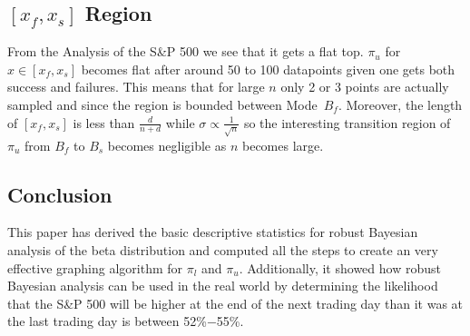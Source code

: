 \documentclass[12pt,letterpaper]{article}
\begin{document}
\subsection{$[x_f,x_s]$ Region}
From the Analysis of the S\&P 500 we see that it gets a flat top. 
$\pi_u$ for $x\in[x_f,x_s]$ becomes flat after around 50 to 100 datapoints given one gets both success and failures.
This means that for large $n$ only 2 or 3 points are actually sampled and since the region is bounded between \mbox{Mode $B_f$}.
Moreover, the length of $[x_f,x_s]$ is less than $\frac{d}{n+d}$ while $\sigma\propto\frac{1}{\sqrt{n}}$ so the interesting 
transition region of $\pi_u$ from $B_f$ to $B_s$ becomes negligible as $n$ becomes large. 
\subsection{Conclusion}
This paper has derived the basic descriptive statistics for robust Bayesian analysis of the beta distribution and computed all the steps to create 
an very effective graphing algorithm for $\pi_l$ and $\pi_u$. Additionally, it showed how robust Bayesian analysis can
be used in the real world by determining the likelihood that  the S\&P 500 will be higher at the end of the next trading day than it was at the last trading day is between 52\%$-$55\%.


\end{document}

